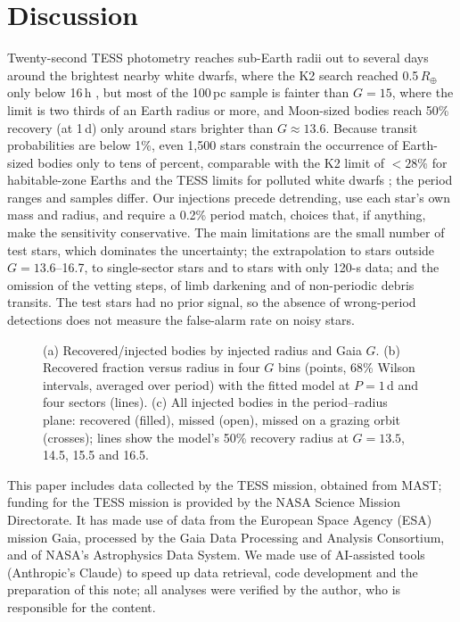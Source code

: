 \documentclass[RNAAS]{aastex631}
\begin{document}
\section{Discussion}
Twenty-second TESS photometry reaches sub-Earth radii out to several days around the brightest nearby white dwarfs,
where the K2 search reached 0.5\,$R_\oplus$ only below 16\,h \citep{vansluijs2018}, but most of the 100\,pc sample is
fainter than $G=15$, where the limit is two thirds of an Earth radius or more, and Moon-sized bodies reach 50\% recovery
(at 1\,d) only around stars brighter than $G\approx13.6$. Because transit probabilities are below 1\%, even 1,500 stars
constrain the occurrence of Earth-sized bodies only to tens of percent, comparable with the K2 limit of $<28\%$ for
habitable-zone Earths \citep{vansluijs2018} and the TESS limits for polluted white dwarfs \citep{robert2024}; the
period ranges and samples differ. Our injections precede detrending, use each star's own mass and radius, and require
a 0.2\% period match, choices that, if anything, make the sensitivity conservative. The main limitations are the
small number of test stars, which dominates the uncertainty; the extrapolation to stars outside $G=13.6$--16.7, to
single-sector stars and to stars with only 120-s data; and the omission of the vetting steps, of limb darkening and
of non-periodic debris transits. The test stars had no prior signal, so the absence of wrong-period detections does
not measure the false-alarm rate on noisy stars.

\begin{figure}[ht!]
\caption{(a) Recovered/injected bodies by injected radius and Gaia $G$. (b) Recovered fraction versus radius in four
$G$ bins (points, 68\% Wilson intervals, averaged over period) with the fitted model at $P=1$\,d and four sectors
(lines). (c) All injected bodies in the period--radius plane: recovered (filled), missed (open), missed on a grazing
orbit (crosses); lines show the model's 50\% recovery radius at $G=13.5$, 14.5, 15.5 and 16.5.\label{fig:1}}
\end{figure}

\begin{acknowledgments}
This paper includes data collected by the TESS mission, obtained from MAST; funding for the TESS mission is provided by
the NASA Science Mission Directorate. It has made use of data from the European Space Agency (ESA) mission Gaia,
processed by the Gaia Data Processing and Analysis Consortium, and of NASA's Astrophysics Data System.
We made use of AI-assisted tools (Anthropic's Claude) to speed up data retrieval, code development and the
preparation of this note; all analyses were verified by the author, who is responsible for the content.
\end{acknowledgments}


{}

\end{document}
